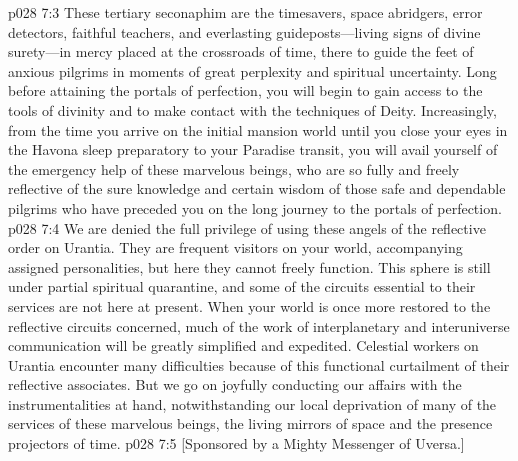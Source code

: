 \vs p028 7:3 These tertiary seconaphim are the timesavers, space abridgers, error detectors, faithful teachers, and everlasting guideposts---living signs of divine surety---in mercy placed at the crossroads of time, there to guide the feet of anxious pilgrims in moments of great perplexity and spiritual uncertainty. Long before attaining the portals of perfection, you will begin to gain access to the tools of divinity and to make contact with the techniques of Deity. Increasingly, from the time you arrive on the initial mansion world until you close your eyes in the Havona sleep preparatory to your Paradise transit, you will avail yourself of the emergency help of these marvelous beings, who are so fully and freely reflective of the sure knowledge and certain wisdom of those safe and dependable pilgrims who have preceded you on the long journey to the portals of perfection.
\vs p028 7:4 We are denied the full privilege of using these angels of the reflective order on Urantia. They are frequent visitors on your world, accompanying assigned personalities, but here they cannot freely function. This sphere is still under partial spiritual quarantine, and some of the circuits essential to their services are not here at present. When your world is once more restored to the reflective circuits concerned, much of the work of interplanetary and interuniverse communication will be greatly simplified and expedited. Celestial workers on Urantia encounter many difficulties because of this functional curtailment of their reflective associates. But we go on joyfully conducting our affairs with the instrumentalities at hand, notwithstanding our local deprivation of many of the services of these marvelous beings, the living mirrors of space and the presence projectors of time.
\vsetoff
\vs p028 7:5 [Sponsored by a Mighty Messenger of Uversa.]
